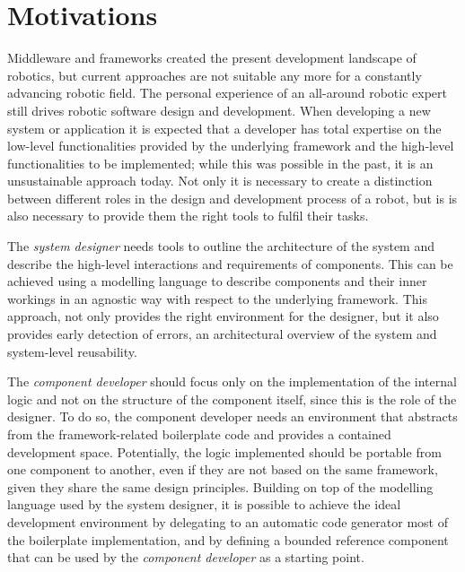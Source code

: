 \section{Motivations}
Middleware and frameworks created the present development landscape of robotics, but current approaches are not suitable any more for a constantly advancing robotic field. The personal experience of an all-around robotic expert still drives robotic software design and development. When developing a new system or application it is expected that a developer has total expertise on the low-level functionalities provided by the underlying framework and the high-level functionalities to be implemented; while this was possible in the past, it is an unsustainable approach today. Not only it is necessary to create a distinction between different roles in the design and development process of a robot, but is is also necessary to provide them the right tools to fulfil  their tasks.

The \textit{system designer} needs tools to outline the architecture of the system and describe the high-level interactions and requirements of components. This can be achieved using a modelling language to describe components and their inner workings in an agnostic way with respect to the underlying framework. This approach, not only provides the right environment for the designer, but it also provides early detection of errors, an architectural overview of the system and system-level reusability. 

The \textit{component developer} should focus only on the implementation of the internal logic and not on the structure of the component itself, since this is the role of the designer. To do so, the component developer needs an environment that abstracts from the framework-related boilerplate code and provides a contained development space. Potentially, the logic implemented should be portable from one component to another, even if they are not based on the same framework, given they share the same design principles. Building on top of the modelling language used by the system designer, it is possible to achieve the ideal development environment by delegating to an automatic code generator most of the boilerplate implementation, and by defining a bounded reference component that can be used by the \textit{component developer} as a starting point.

